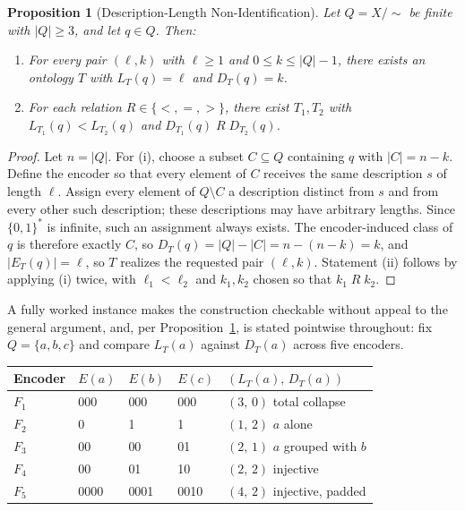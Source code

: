 \documentclass[11pt]{article}
\theoremstyle{plain}
\newtheorem{proposition}{Proposition}
\begin{document}
\begin{proposition}[Description-Length Non-Identification]
\label{prop:nonident}
Let $Q = X/\!\sim$ be finite with $|Q| \ge 3$, and let $q \in Q$. Then:
\begin{enumerate}
\item[(i)] For every pair $(\ell, k)$ with $\ell \ge 1$ and $0 \le k \le |Q| - 1$, there exists an ontology $T$ with $L_T(q) = \ell$ and $D_T(q) = k$.
\item[(ii)] For each relation $R \in \{<, =, >\}$, there exist $T_1, T_2$ with $L_{T_1}(q) < L_{T_2}(q)$ and $D_{T_1}(q) \; R \; D_{T_2}(q)$.
\end{enumerate}
\end{proposition}

\begin{proof}
Let $n = |Q|$. For (i), choose a subset $C \subseteq Q$ containing $q$ with $|C| = n - k$. Define the encoder so that every element of $C$ receives the same description $s$ of length $\ell$. Assign every element of $Q \setminus C$ a description distinct from $s$ and from every other such description; these descriptions may have arbitrary lengths. Since $\{0,1\}^*$ is infinite, such an assignment always exists. The encoder-induced class of $q$ is therefore exactly $C$, so $D_T(q) = |Q| - |C| = n - (n-k) = k$, and $|E_T(q)| = \ell$, so $T$ realizes the requested pair $(\ell,k)$. Statement (ii) follows by applying (i) twice, with $\ell_1 < \ell_2$ and $k_1, k_2$ chosen so that $k_1 \; R \; k_2$.
\end{proof}

A fully worked instance makes the construction checkable without appeal to the general argument, and, per Proposition~\ref{prop:nonident}, is stated pointwise throughout: fix $Q = \{a,b,c\}$ and compare $L_T(a)$ against $D_T(a)$ across five encoders.

\begin{center}
\begin{tabular}{lllll}
Encoder & $E(a)$ & $E(b)$ & $E(c)$ & $(L_T(a),\,D_T(a))$ \\
\hline
$F_1$ & 000 & 000 & 000 & $(3,\,0)$ \quad total collapse \\
$F_2$ & 0 & 1 & 1 & $(1,\,2)$ \quad $a$ alone \\
$F_3$ & 00 & 00 & 01 & $(2,\,1)$ \quad $a$ grouped with $b$ \\
$F_4$ & 00 & 01 & 10 & $(2,\,2)$ \quad injective \\
$F_5$ & 0000 & 0001 & 0010 & $(4,\,2)$ \quad injective, padded \\
\end{tabular}
\end{center}
\end{document}
